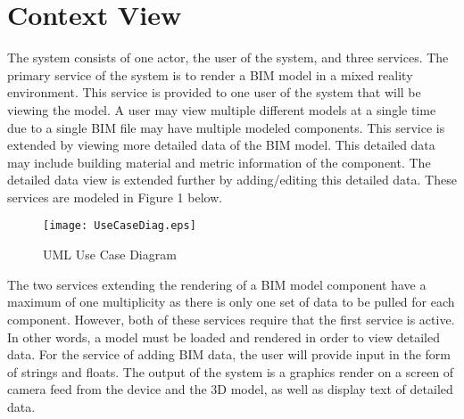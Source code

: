\documentclass[onecolumn, draftclsnofoot,10pt, compsoc]{IEEEtran}
\begin{document}
\section{Context View}
The system consists of one actor, the user of the system, and three services.
The primary service of the system is to render a BIM model in a mixed reality environment.
This service is provided to one user of the system that will be viewing the model.
A user may view multiple different models at a single time due to a single BIM file may have multiple modeled components.
This service is extended by viewing more detailed data of the BIM model.
This detailed data may include building material and metric information of the component.
The detailed data view is extended further by adding/editing this detailed data.
These services are modeled in Figure 1 below.
\par
\begin{figure}[ht]
    \centering
    \texttt{[image: UseCaseDiag.eps]}
    \caption{UML Use Case Diagram}
    \label{fig:UseCaseDiagram}
\end{figure}
The two services extending the rendering of a BIM model component have a maximum of one multiplicity as there is only one set of data to be pulled for each component.
However, both of these services require that the first service is active.
In other words, a model must be loaded and rendered in order to view detailed data.
For the service of adding BIM data, the user will provide input in the form of strings and floats.
The output of the system is a graphics render on a screen of camera feed from the device and the 3D model, as well as display text of detailed data.
\par
\end{document}
